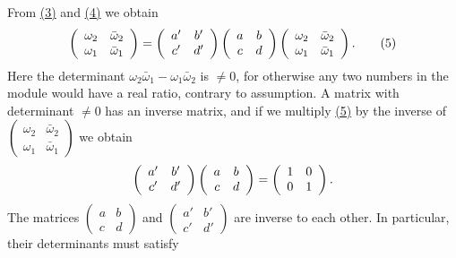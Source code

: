 From \hyperref[eq:7.3]{(3)} and \hyperref[eq:7.4]{(4)} we obtain
\begin{equation*}
\left( \begin{array}{c c} \omega_ {2} & \bar {\omega} _ {2} \\ \omega_ {1} & \bar {\omega} _ {1} \end{array} \right) = \left( \begin{array}{c c} a ^ {\prime} & b ^ {\prime} \\ c ^ {\prime} & d ^ {\prime} \end{array} \right) \left( \begin{array}{c c} a & b \\ c & d \end{array} \right) \left( \begin{array}{c c} \omega_ {2} & \bar {\omega} _ {2} \\ \omega_ {1} & \bar {\omega} _ {1} \end{array} \right).\tag{5}\label{eq:7.5}
\end{equation*}
Here the determinant $\omega_{2}\bar{\omega}_{1} - \omega_{1}\bar{\omega}_{2}$ is $\neq 0$, for otherwise any two numbers in the module would have a real ratio, contrary to assumption. A matrix with determinant $\neq 0$ has an inverse matrix, and if we multiply \hyperref[eq:7.5]{(5)} by the inverse of $\left( \begin{array}{cc}\omega_2 & \bar{\omega}_2\\ \omega_1 & \bar{\omega}_1 \end{array} \right)$ we obtain
\begin{equation*}
\left( \begin{array}{c c} a ^ {\prime} & b ^ {\prime} \\ c ^ {\prime} & d ^ {\prime} \end{array} \right) \left( \begin{array}{c c} a & b \\ c & d \end{array} \right) = \left( \begin{array}{c c} 1 & 0 \\ 0 & 1 \end{array} \right).
\end{equation*}
The matrices $\begin{pmatrix} a & b \\ c & d \end{pmatrix}$ and $\begin{pmatrix} a' & b' \\ c' & d' \end{pmatrix}$ are inverse to each other. In particular, their determinants must satisfy
